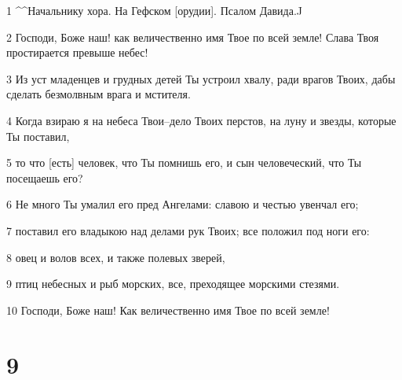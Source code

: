\par 1 ^^Начальнику хора. На Гефском [орудии]. Псалом Давида.^^
\par 2 Господи, Боже наш! как величественно имя Твое по всей земле! Слава Твоя простирается превыше небес!
\par 3 Из уст младенцев и грудных детей Ты устроил хвалу, ради врагов Твоих, дабы сделать безмолвным врага и мстителя.
\par 4 Когда взираю я на небеса Твои--дело Твоих перстов, на луну и звезды, которые Ты поставил,
\par 5 то что [есть] человек, что Ты помнишь его, и сын человеческий, что Ты посещаешь его?
\par 6 Не много Ты умалил его пред Ангелами: славою и честью увенчал его;
\par 7 поставил его владыкою над делами рук Твоих; все положил под ноги его:
\par 8 овец и волов всех, и также полевых зверей,
\par 9 птиц небесных и рыб морских, все, преходящее морскими стезями.
\par 10 Господи, Боже наш! Как величественно имя Твое по всей земле!

\chapter{9}

